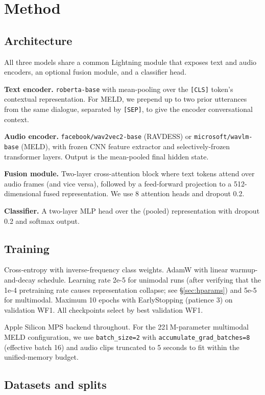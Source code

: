 \documentclass[a4paper,10pt]{article}
\begin{document}
\section{Method}

\subsection{Architecture}

All three models share a common Lightning module that exposes text and
audio encoders, an optional fusion module, and a classifier head.

\textbf{Text encoder.} \texttt{roberta-base} with mean-pooling over the
\texttt{[CLS]} token's contextual representation. For MELD, we prepend up
to two prior utterances from the same dialogue, separated by \texttt{[SEP]},
to give the encoder conversational context.

\textbf{Audio encoder.} \texttt{facebook/wav2vec2-base} (RAVDESS) or
\texttt{microsoft/wavlm-base} (MELD), with frozen CNN feature extractor and
selectively-frozen transformer layers. Output is the mean-pooled final
hidden state.

\textbf{Fusion module.} Two-layer cross-attention block where text tokens
attend over audio frames (and vice versa), followed by a feed-forward
projection to a 512-dimensional fused representation. We use 8 attention
heads and dropout 0.2.

\textbf{Classifier.} A two-layer MLP head over the (pooled) representation
with dropout 0.2 and softmax output.

\subsection{Training}

Cross-entropy with inverse-frequency class weights. AdamW with linear
warmup-and-decay schedule. Learning rate 2e-5 for unimodal runs (after
verifying that the 1e-4 pretraining rate causes representation collapse;
see \S\ref{sec:hparams}) and 5e-5 for multimodal. Maximum 10 epochs with
EarlyStopping (patience 3) on validation WF1. All checkpoints select by
best validation WF1.

Apple Silicon MPS backend throughout. For the 221\,M-parameter multimodal
MELD configuration, we use \texttt{batch\_size=2} with
\texttt{accumulate\_grad\_batches=8} (effective batch 16) and audio clips
truncated to 5 seconds to fit within the unified-memory budget.

\subsection{Datasets and splits}
\end{document}
